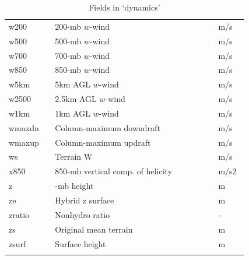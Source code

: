\documentclass[11pt,fleqn]{report}              %
\begin{document}
\begin{enumerate}
\begin{enumerate}
{\begin{longtable}{p{0.17\linewidth} | p{0.6\linewidth} | p{0.11\linewidth} }
  w200 & 200-mb $w$-wind & m/s \\
  w500 & 500-mb $w$-wind & m/s \\
  w700 & 700-mb $w$-wind & m/s \\
  w850 & 850-mb $w$-wind & m/s \\
  w5km & 5km AGL $w$-wind & m/s \\
  w2500 & 2.5km AGL $w$-wind & m/s \\
  w1km & 1km AGL $w$-wind & m/s \\
  wmaxdn & Column-maximum downdraft & m/s \\
  wmaxup & Column-maximum updraft & m/s \\
  ws & Terrain W & m/s \\
  x850 & 850-mb vertical comp. of helicity & m/s2 \\
  z & -mb height & m \\
  ze & Hybrid z surface & m \\
  zratio & Nonhydro ratio & - \\
  zs & Original mean terrain & m \\
  zsurf & Surface height & m  \\
\hline
\caption{Fields in `dynamics'}
\label{table:fv3_fld_dynamics}
\end{longtable}
}



\end{enumerate}
\end{enumerate}
\end{document}
